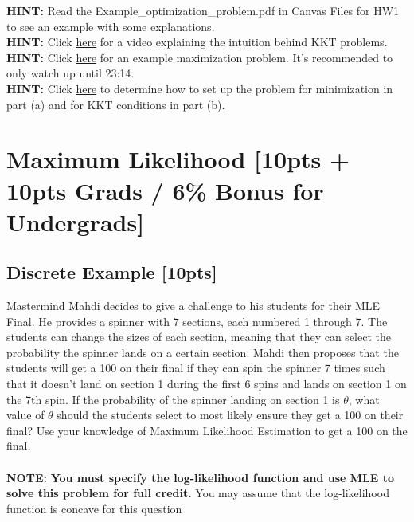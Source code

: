 \documentclass{article}
\begin{document}
\noindent\textbf{HINT:} Read the Example\_optimization\_problem.pdf in Canvas Files for HW1 to see an example with some explanations. \\
\noindent\textbf{HINT:} Click \href{https://www.youtube.com/watch?v=TqN-8fxYUYY}{here} for a video explaining the intuition behind KKT problems.\\
\noindent\textbf{HINT:} Click \href{https://www.youtube.com/watch?v=TqN-8fxYUYY}{here} for an example maximization problem. It's recommended to only watch up until 23:14. \\
\noindent\textbf{HINT:} Click \href{https://en.wikipedia.org/wiki/Karush-Kuhn-Tucker_conditions#Nonlinear_optimization_problem}{here} to determine how to set up the problem for minimization in part (a) and for KKT conditions in part (b).\\


\newpage


\section{Maximum Likelihood [10pts + 10pts Grads / 6\% Bonus for Undergrads]}
\subsection{Discrete Example [10pts]}
Mastermind Mahdi decides to give a challenge to his students for their MLE Final. He provides a spinner with 7 sections, each numbered 1 through 7. The students can change the sizes of each section, meaning that they can select the probability the spinner lands on a certain section. Mahdi then proposes that the students will get a 100 on their final if they can spin the spinner 7 times such that it doesn't land on section 1 during the first 6 spins and lands on section 1 on the 7th spin. If the probability of the spinner landing on section 1 is $\theta$, what value of $\theta$ should the students select to most likely ensure they get a 100 on their final? Use your knowledge of Maximum Likelihood Estimation to get a 100 on the final. \\\\\textbf{NOTE: } \textbf{You must specify the log-likelihood function and use MLE to solve this problem for full credit.} You may assume that the log-likelihood function is concave for this question \\\\
\end{document}
